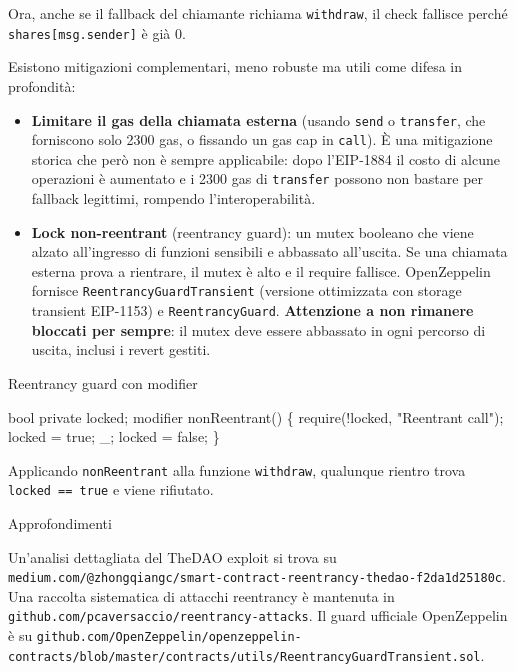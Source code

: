 \documentclass[
  italian,
  openany]{book}
\newenvironment{Shaded}{\begin{snugshade}}{\end{snugshade}}
\newcommand{\NormalTok}[1]{#1}
\providecommand{\tightlist}{%
  \setlength{\itemsep}{0pt}\setlength{\parskip}{0pt}}
\begin{document}
Ora, anche se il fallback del chiamante richiama \texttt{withdraw}, il
check fallisce perché \texttt{shares{[}msg.sender{]}} è già 0.

Esistono mitigazioni complementari, meno robuste ma utili come difesa in
profondità:

\begin{itemize}
\tightlist
\item
  \textbf{Limitare il gas della chiamata esterna} (usando \texttt{send}
  o \texttt{transfer}, che forniscono solo 2300 gas, o fissando un gas
  cap in \texttt{call}). È una mitigazione storica che però non è sempre
  applicabile: dopo l'EIP-1884 il costo di alcune operazioni è aumentato
  e i 2300 gas di \texttt{transfer} possono non bastare per fallback
  legittimi, rompendo l'interoperabilità.
\item
  \textbf{Lock non-reentrant} (reentrancy guard): un mutex booleano che
  viene alzato all'ingresso di funzioni sensibili e abbassato
  all'uscita. Se una chiamata esterna prova a rientrare, il mutex è alto
  e il require fallisce. OpenZeppelin fornisce
  \texttt{ReentrancyGuardTransient} (versione ottimizzata con storage
  transient EIP-1153) e \texttt{ReentrancyGuard}. \textbf{Attenzione a
  non rimanere bloccati per sempre}: il mutex deve essere abbassato in
  ogni percorso di uscita, inclusi i revert gestiti.
\end{itemize}

\begin{callouttip}{Reentrancy guard con modifier}

\begin{Shaded}
\begin{Highlighting}[]
\NormalTok{bool private locked;}
\NormalTok{modifier nonReentrant() \{}
\NormalTok{    require(!locked, "Reentrant call");}
\NormalTok{    locked = true;}
\NormalTok{    \_;}
\NormalTok{    locked = false;}
\NormalTok{\}}
\end{Highlighting}
\end{Shaded}

Applicando \texttt{nonReentrant} alla funzione \texttt{withdraw},
qualunque rientro trova \texttt{locked\ ==\ true} e viene rifiutato.

\end{callouttip}

\begin{calloutnote}{Approfondimenti}

Un'analisi dettagliata del TheDAO exploit si trova su
\texttt{medium.com/@zhongqiangc/smart-contract-reentrancy-thedao-f2da1d25180c}.
Una raccolta sistematica di attacchi reentrancy è mantenuta in
\texttt{github.com/pcaversaccio/reentrancy-attacks}. Il guard ufficiale
OpenZeppelin è su
\texttt{github.com/OpenZeppelin/openzeppelin-contracts/blob/master/contracts/utils/ReentrancyGuardTransient.sol}.

\end{calloutnote}
\end{document}
